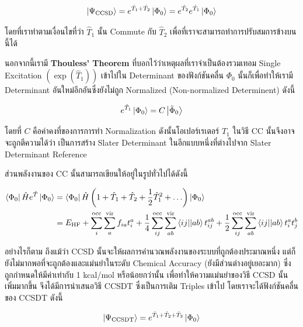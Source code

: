 \begin{equation}
    \ket{\Psi_{\mathrm{CCSD}}}
    = e^{\hat{T}_1 + \hat{T}_2} \ket{\Phi_0}
    = e^{\hat{T}_2}e^{\hat{T}_1} \ket{\Phi_0}
\end{equation}

\noindent โดยที่เราทำตามเงื่อนไขที่ว่า $\hat{T}_1$ นั้น Commute กับ $\hat{T}_2$ เพื่อที่เราจะสามารถทำการปรับสมการข้างบนนี้ได้

นอกจากนี้เรามี \textbf{Thouless' Theorem} ที่บอกไว้ว่าเหตุผลที่เราจำเป็นต้องรวมเทอม Single Excitation $(\exp(\hat{T}_1))$
เข้าไปใน Determinant ของฟังก์ชันคลื่น $\Phi_0$ นั้นก็เพื่อทำให้เรามี Determinant อันใหม่อีกอันซึ่งยังไม่ถูก Normalized (Non-normalized
Determinent) ดังนี้

\begin{equation}
    e^{\hat{T}_1} \ket{\Phi_0} = C \ket{\tilde{\Phi}_0}
\end{equation}

\noindent โดยที่ $C$ คือค่าคงที่ของการการทำ Normalization ดังนั้นโอเปอร์เรเตอร์ $\hat{T}_1$ ในวิธี CC นั้นจึงอาจจะถูกตีความได้ว่า%
เป็นการสร้าง Slater Determinant ในอีกแบบหนึ่งที่ต่างไปจาก Slater Determinant Reference

ส่วนพลังงานของ CC นั้นสามารถเขียนให้อยู่ในรูปทั่วไปได้ดังนี้

\begin{equation}
    \begin{split}
        \bra{\Phi_0}\hat{H}e^{\hat{T}}\ket{\Phi_0}
        &= \bra{\Phi_0}\hat{H}
        \left(1 + \hat{T}_1 + \hat{T}_2  + \frac{1}{2} \hat{T}_1^2+ \ldots\right)\ket{\Phi_0} \\
        &= E_{\mathrm{HF}} +
        \sum_{i}^{\mathrm{occ}} \sum_{a}^{\mathrm{vir}} f_{ia} t_{i}^{a}
        + \frac{1}{4} \sum_{ij}^{\mathrm{occ}} \sum_{ab}^{\mathrm{vir}} \bra{ij}\!\ket{ab} t_{ij}^{ab}
        + \frac{1}{2} \sum_{ij}^{\mathrm{occ}} \sum_{ab}^{\mathrm{vir}} \bra{ij}\!\ket{ab} t_{i}^{a} t_{j}^{b}
    \end{split}
\end{equation}

อย่างไรก็ตาม ถึงแม้ว่า CCSD นั้นจะให้ผลการคำนวณพลังงานของระบบที่ถูกต้องประมาณหนึ่ง แต่ก็ยังไม่มากพอที่จะถูกต้องและแม่นยำในระดับ Chemical
Accuracy (ยังมีส่วนต่างอยู่เยอะมาก) ซึ่งถูกกำหนดให้มีค่าเท่ากับ 1 kcal/mol หรือน้อยกว่านั้น เพื่อทำให้ความแม่นยำของวิธี CCSD นั้นเพิ่มมากขึ้น
จึงได้มีการนำเสนอวิธี CCSDT ซึ่งเป็นการเติม Triples เข้าไป โดยเราจะได้ฟังก์ชันคลื่นของ CCSDT ดังนี้

\begin{equation}
    \ket{\Psi_{\mathrm{CCSDT}}}
    =
    e^{\hat{T}_1 + \hat{T}_2+ \hat{T}_3} \ket{\Phi_0}
\end{equation}


